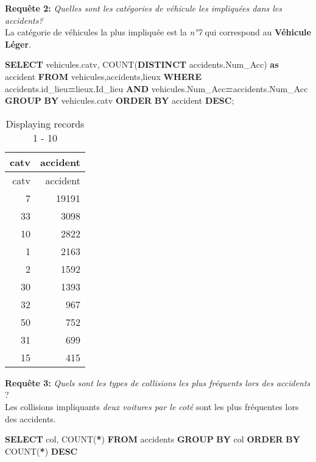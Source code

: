 \documentclass[mstat,12pt]{unswthesis}
\newenvironment{Shaded}{\begin{snugshade}}{\end{snugshade}}
\newcommand{\FunctionTok}[1]{\textcolor[rgb]{0.00,0.00,0.00}{#1}}
\newcommand{\KeywordTok}[1]{\textcolor[rgb]{0.13,0.29,0.53}{\textbf{#1}}}
\newcommand{\NormalTok}[1]{#1}
\newcommand{\OperatorTok}[1]{\textcolor[rgb]{0.81,0.36,0.00}{\textbf{#1}}}
\begin{document}
\medskip

\textbf{Requête 2:} \emph{Quelles sont les catégories de véhicule les
impliquées dans les accidents?}\\
La catégorie de véhicules la plus impliquée est la \emph{n°7} qui
correspond au \textbf{Véhicule Léger}.

\begin{Shaded}
\begin{Highlighting}[]
\KeywordTok{SELECT}\NormalTok{ vehicules.catv, }\FunctionTok{COUNT}\NormalTok{(}\KeywordTok{DISTINCT}\NormalTok{ accidents.Num\_Acc) }\KeywordTok{as}\NormalTok{ accident}
\KeywordTok{FROM}\NormalTok{ vehicules,accidents,lieux}
\KeywordTok{WHERE}\NormalTok{ accidents.id\_lieu}\OperatorTok{=}\NormalTok{lieux.Id\_lieu}
\KeywordTok{AND}\NormalTok{ vehicules.Num\_Acc}\OperatorTok{=}\NormalTok{accidents.Num\_Acc}
\KeywordTok{GROUP} \KeywordTok{BY}\NormalTok{ vehicules.catv}
\KeywordTok{ORDER} \KeywordTok{BY}\NormalTok{ accident }\KeywordTok{DESC}\NormalTok{;}
\end{Highlighting}
\end{Shaded}

\begin{longtable}[]{@{}rr@{}}
\caption{Displaying records 1 - 10}\tabularnewline
\toprule()
catv & accident \\
\midrule()
\endfirsthead
\toprule()
catv & accident \\
\midrule()
\endhead
7 & 19191 \\
33 & 3098 \\
10 & 2822 \\
1 & 2163 \\
2 & 1592 \\
30 & 1393 \\
32 & 967 \\
50 & 752 \\
31 & 699 \\
15 & 415 \\
\bottomrule()
\end{longtable}

\medskip

\textbf{Requête 3:} \emph{Quels sont les types de collisions les plus
fréquents lors des accidents }?\\
Les collisions impliquants \emph{deux voitures par le coté} sont les
plus fréquentes lors des accidents.

\begin{Shaded}
\begin{Highlighting}[]
\KeywordTok{SELECT}\NormalTok{ col, }\FunctionTok{COUNT}\NormalTok{(}\OperatorTok{*}\NormalTok{)}
\KeywordTok{FROM}\NormalTok{ accidents}
\KeywordTok{GROUP} \KeywordTok{BY}\NormalTok{ col}
\KeywordTok{ORDER} \KeywordTok{BY} \FunctionTok{COUNT}\NormalTok{(}\OperatorTok{*}\NormalTok{) }\KeywordTok{DESC}
\end{Highlighting}
\end{Shaded}
\end{document}
